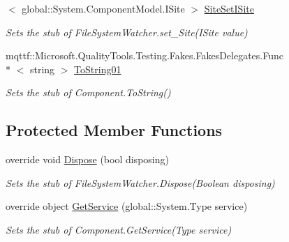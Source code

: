 \begin{DoxyCompactItemize}
$<$ global\-::\-System.\-Component\-Model.\-I\-Site $>$ \hyperlink{class_system_1_1_i_o_1_1_fakes_1_1_stub_file_system_watcher_a270016728fabc4e6cc962cacd6c00d2f}{Site\-Set\-I\-Site}
\begin{DoxyCompactList}\small\item\em Sets the stub of File\-System\-Watcher.\-set\-\_\-\-Site(\-I\-Site value)\end{DoxyCompactList}\item 
mqttf\-::\-Microsoft.\-Quality\-Tools.\-Testing.\-Fakes.\-Fakes\-Delegates.\-Func\\*
$<$ string $>$ \hyperlink{class_system_1_1_i_o_1_1_fakes_1_1_stub_file_system_watcher_a79c59ff1740a0e17adbdb13bbcfca071}{To\-String01}
\begin{DoxyCompactList}\small\item\em Sets the stub of Component.\-To\-String()\end{DoxyCompactList}\end{DoxyCompactItemize}
\subsection*{Protected Member Functions}
\begin{DoxyCompactItemize}
\item 
override void \hyperlink{class_system_1_1_i_o_1_1_fakes_1_1_stub_file_system_watcher_a197b13d1ade6305b124d17b1dfd522cc}{Dispose} (bool disposing)
\begin{DoxyCompactList}\small\item\em Sets the stub of File\-System\-Watcher.\-Dispose(\-Boolean disposing)\end{DoxyCompactList}\item 
override object \hyperlink{class_system_1_1_i_o_1_1_fakes_1_1_stub_file_system_watcher_ae0bb40dd6fb997893e7504d15383aa07}{Get\-Service} (global\-::\-System.\-Type service)
\begin{DoxyCompactList}\small\item\em Sets the stub of Component.\-Get\-Service(\-Type service)\end{DoxyCompactList}\end{DoxyCompactItemize}
